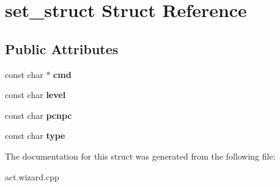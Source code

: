 \hypertarget{structset__struct}{}\section{set\+\_\+struct Struct Reference}
\label{structset__struct}
\subsection*{Public Attributes}
\begin{DoxyCompactItemize}
\item 
\mbox{\label{structset__struct_a917464b8ea387ad426e7fa2682ac341c}} 
const char $\ast$ {\bfseries cmd}
\item 
\mbox{\label{structset__struct_af8f5d628be8ca851aded482f73ae45f0}} 
const char {\bfseries level}
\item 
\mbox{\label{structset__struct_a81990f4bcb83f8403c614adfd0c1497e}} 
const char {\bfseries pcnpc}
\item 
\mbox{\label{structset__struct_ac248d5f3e0481e7f8db9b945e8421475}} 
const char {\bfseries type}
\end{DoxyCompactItemize}


The documentation for this struct was generated from the following file\+:\begin{DoxyCompactItemize}
\item 
act.\+wizard.\+cpp\end{DoxyCompactItemize}
